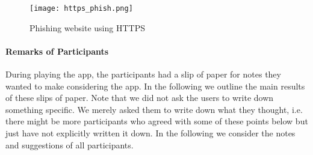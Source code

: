 \begin{figure}
	\centering
	\texttt{[image: https\_phish.png]}
	\caption{Phishing website using HTTPS}
	\label{fig:https_phish}
	\end{figure}
	
\paragraph{Remarks of Participants}
During playing the app, the participants had a slip of paper for notes they wanted to make considering the app.
In the following we outline the main results of these slips of paper.
Note that we did not ask the users to write down something specific. 
We merely asked them to write down what they thought, i.e. there might be more participants who agreed with some of these points below but just have not explicitly written it down.
In the following we consider the notes and suggestions of all participants. 
